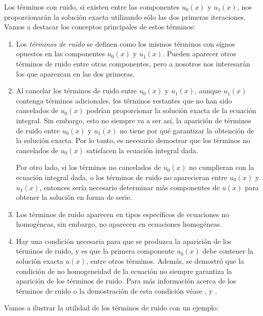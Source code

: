 Los términos con ruido, si existen entre las componentes $u_0(x)$ y $u_1(x)$, nos proporcionarán la solución exacta utilizando sólo las dos primeras iteraciones. Vamos a destacar los conceptos principales de estos términos:
\begin{enumerate}
	\item Los \textit{términos de ruido} se definen como los mismos términos con signos opuestos en las componentes $u_0(x)$ y $u_1(x)$. Pueden aparecer otros términos de ruido entre otras componentes, pero a nosotros nos interesarán los que aparezcan en las dos primeras.
	\item Al cancelar los términos de ruido entre $u_0(x)$ y $u_1(x)$, aunque $u_1(x)$ contenga términos adicionales, los términos restantes que no han sido cancelados de $u_0(x)$ podrían proporcionar la solución exacta de la ecuación integral. Sin embargo, esto no siempre va a ser así, la aparición de términos de ruido entre $u_0(x)$ y $u_1(x)$ no tiene por qué garantizar la obtención de la solución exacta. Por lo tanto, es necesario demostrar que los términos no cancelados de $u_0(x)$ satisfacen la ecuación integral dada. 
	
	Por otro lado, si los términos no cancelados de $u_0(x)$ no cumplieran con la ecuación integral dada, o los términos de ruido no aparecieran entre $u_0(x)$ y $u_1(x)$, entonces sería necesario determinar más componentes de $u(x)$ para obtener la solución en forma de serie.
	\item Los términos de ruido aparecen en tipos específicos de ecuaciones no homogéneas, sin embargo, no aparecen en ecuaciones homogéneas.
	\item Hay una condición necesaria para que se produzca la aparición de los términos de ruido, y es que la primera componente $u_0(x)$ debe contener la solución exacta $u(x)$, entre otros términos. Además, se demostró que la condición de no homogeneidad de la ecuación no siempre garantiza la aparición de los términos de ruido. Para más información acerca de los términos de ruido o la demostración de esta condición véase \cite{WazWaznoise}, \cite{WazWaz1} y \cite{WazWaz2}.
\end{enumerate}
Vamos a ilustrar la utilidad de los términos de ruido con un ejemplo:
